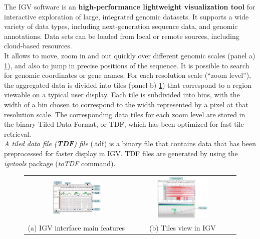 The IGV software is an \textbf{high-performance lightweight visualization tool} for interactive exploration of large, integrated genomic datasets. It supports a wide variety of data types, including next-generation sequence data, and genomic annotations. Data sets can be loaded from local or remote sources, including cloud-based resources.
\\
It allows to move, zoom in and out quickly over different genomic scales
(panel a) \ref{fig:IGV_navigation}), and also to jump in precise positions
of the sequence. It is possible to search for genomic coordinates or gene names.
For each resolution scale (“zoom level”), the aggregated data is divided into
tiles (panel b) \ref{fig:IGV_navigation}) that correspond to a region viewable on a
typical user display. Each tile is subdivided into bins, with the width of a bin
chosen to correspond to the width represented by a pixel at that resolution
scale. The corresponding data tiles for each zoom level are stored in the binary
Tiled Data Format, or TDF, which has been optimized for fast tile retrieval.\\
\textit{A tiled data file (\textbf{TDF}) file} (.tdf) is a binary file that
contains data that has been preprocessed for faster display in IGV. TDF files
are generated by using the \textit{igvtools} package (\textit{toTDF} command).\\

\begin{figure}[H]
\begin{tabular}{cc}
  \includegraphics[width=0.5\textwidth]{IGVview.PNG} &   \includegraphics[width=0.5\textwidth]{TileView.PNG} \\
(a) IGV interface main features & (b) Tiles view in IGV \\[6pt]
\end{tabular}
\caption{}
\label{fig:IGV_navigation}
\end{figure}


